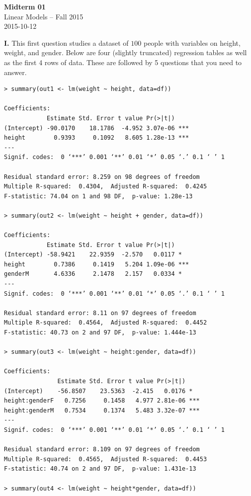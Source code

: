 \documentclass[12pt]{article}
\begin{document}
\begin{center}
{\bf Midterm 01} \\
Linear Models -- Fall 2015 \\
2015-10-12
\end{center}

\medskip

{\bf I.} This first question studies a dataset of $100$ people with variables
on height, weight, and gender. Below are four (slightly truncated)
regression tables as well as the first 4 rows of data. These are
followed by 5 questions that you need to answer.

\small
\begin{verbatim}
> summary(out1 <- lm(weight ~ height, data=df))

Coefficients:
            Estimate Std. Error t value Pr(>|t|)
(Intercept) -90.0170    18.1786  -4.952 3.07e-06 ***
height        0.9393     0.1092   8.605 1.28e-13 ***
---
Signif. codes:  0 ‘***’ 0.001 ‘**’ 0.01 ‘*’ 0.05 ‘.’ 0.1 ‘ ’ 1

Residual standard error: 8.259 on 98 degrees of freedom
Multiple R-squared:  0.4304,  Adjusted R-squared:  0.4245
F-statistic: 74.04 on 1 and 98 DF,  p-value: 1.28e-13

> summary(out2 <- lm(weight ~ height + gender, data=df))

Coefficients:
            Estimate Std. Error t value Pr(>|t|)
(Intercept) -58.9421    22.9359  -2.570   0.0117 *
height        0.7386     0.1419   5.204 1.09e-06 ***
genderM       4.6336     2.1478   2.157   0.0334 *
---
Signif. codes:  0 ‘***’ 0.001 ‘**’ 0.01 ‘*’ 0.05 ‘.’ 0.1 ‘ ’ 1

Residual standard error: 8.11 on 97 degrees of freedom
Multiple R-squared:  0.4564,  Adjusted R-squared:  0.4452
F-statistic: 40.73 on 2 and 97 DF,  p-value: 1.444e-13

> summary(out3 <- lm(weight ~ height:gender, data=df))

Coefficients:
               Estimate Std. Error t value Pr(>|t|)
(Intercept)    -56.8507    23.5363  -2.415   0.0176 *
height:genderF   0.7256     0.1458   4.977 2.81e-06 ***
height:genderM   0.7534     0.1374   5.483 3.32e-07 ***
---
Signif. codes:  0 ‘***’ 0.001 ‘**’ 0.01 ‘*’ 0.05 ‘.’ 0.1 ‘ ’ 1

Residual standard error: 8.109 on 97 degrees of freedom
Multiple R-squared:  0.4565,  Adjusted R-squared:  0.4453
F-statistic: 40.74 on 2 and 97 DF,  p-value: 1.431e-13

> summary(out4 <- lm(weight ~ height*gender, data=df))


\end{verbatim}
\end{document}

